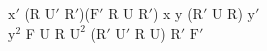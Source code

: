 $\text{x}'$ (R $\text{U}'$ $\text{R}'$)($\text{F}'$ R U $\text{R}'$) x y ($\text{R}'$ U R) $\text{y}'$\\
$\text{y}^2$ F U R $\text{U}^2$ ($\text{R}'$ $\text{U}'$ R U) $\text{R}'$ $\text{F}'$\\
